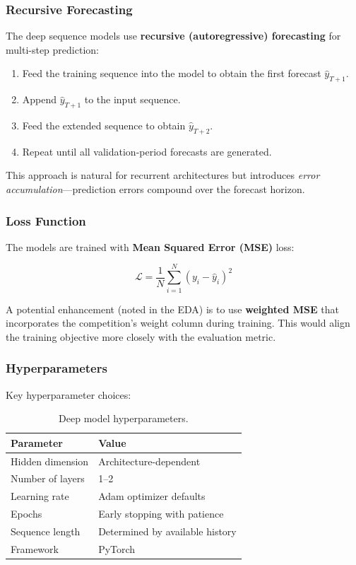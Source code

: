 \subsubsection{Recursive Forecasting}

The deep sequence models use \textbf{recursive (autoregressive) forecasting} for multi-step prediction:

\begin{enumerate}
    \item Feed the training sequence into the model to obtain the first forecast $\hat{y}_{T+1}$.
    \item Append $\hat{y}_{T+1}$ to the input sequence.
    \item Feed the extended sequence to obtain $\hat{y}_{T+2}$.
    \item Repeat until all validation-period forecasts are generated.
\end{enumerate}

This approach is natural for recurrent architectures but introduces \emph{error accumulation}---prediction errors compound over the forecast horizon.

\subsubsection{Loss Function}

The models are trained with \textbf{Mean Squared Error (MSE)} loss:

\begin{equation}
\mathcal{L} = \frac{1}{N} \sum_{i=1}^{N} (y_i - \hat{y}_i)^2
\end{equation}

A potential enhancement (noted in the EDA) is to use \textbf{weighted MSE} that incorporates the competition's weight column during training. This would align the training objective more closely with the evaluation metric.

\subsubsection{Hyperparameters}

Key hyperparameter choices:

\begin{table}[H]
\centering
\caption{Deep model hyperparameters.}
\begin{tabular}{ll}
\toprule
\textbf{Parameter} & \textbf{Value} \\
\midrule
Hidden dimension & Architecture-dependent \\
Number of layers & 1--2 \\
Learning rate & Adam optimizer defaults \\
Epochs & Early stopping with patience \\
Sequence length & Determined by available history \\
Framework & PyTorch \\
\bottomrule
\end{tabular}
\end{table}

